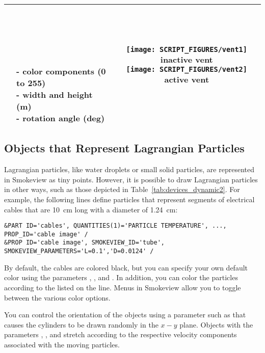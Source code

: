 \begin{longtable}[ht]{|l|l|c|}
\ct{vent} &
\parbox[c]{\boxwidth}{
\hspace{1in} \\
\\
\\
\\ \\
 - color components (0 to 255) \\
 - width and height (m) \\
 - rotation angle (deg) \\
\hspace{1in}
} &
\parbox[c]{\devicewidth}{
\vspace{0.01in}
\texttt{[image: SCRIPT\_FIGURES/vent1]}
inactive vent\\
\vspace{0.01in}
\texttt{[image: SCRIPT\_FIGURES/vent2]}
active vent\\
\vspace{0.01in}
}
\\ \hline
\end{longtable}


\subsection{Objects that Represent Lagrangian Particles}
\label{info:SMOKEVIEW_PART}

Lagrangian particles, like water droplets or small solid particles, are represented in Smokeview as tiny points. However, it is possible to draw Lagrangian particles in other ways, such as those depicted in Table~\ref{tab:devices_dynamic2}. For example, the following lines define particles that represent segments of electrical cables that are 10~cm long with a diameter of 1.24~cm:
\begin{lstlisting}
&PART ID='cables', QUANTITIES(1)='PARTICLE TEMPERATURE', ..., PROP_ID='cable image' /
&PROP ID='cable image', SMOKEVIEW_ID='tube', SMOKEVIEW_PARAMETERS='L=0.1','D=0.0124' /
\end{lstlisting}
By default, the cables are colored black, but you can specify your own default color using the parameters , , and . In addition, you can color the particles according to the listed  on the  line. Menus in Smokeview allow you to toggle between the various color options.

You can control the orientation of the  objects using a parameter such as  that causes the cylinders to be drawn randomly in the $x-y$ plane. Objects with the parameters , , and  stretch according to the respective velocity components associated with the moving particles.

